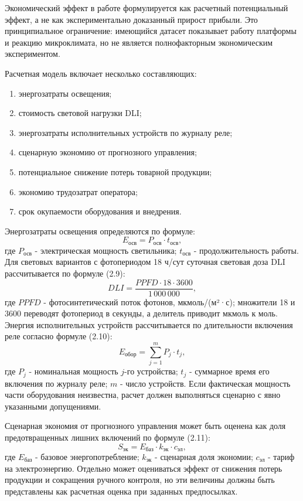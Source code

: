 \documentclass[a4paper,14pt]{extarticle}
\providecommand{\tightlist}{%
  \setlength{\itemsep}{0pt}\setlength{\parskip}{0pt}}
\begin{document}
Экономический эффект в работе формулируется как расчетный потенциальный
эффект, а не как экспериментально доказанный прирост прибыли. Это
принципиальное ограничение: имеющийся датасет показывает работу
платформы и реакцию микроклимата, но не является полнофакторным
экономическим экспериментом.

Расчетная модель включает несколько составляющих:

\begin{enumerate}
\def\labelenumi{\arabic{enumi})}
\tightlist
\item
  энергозатраты освещения;
\item
  стоимость световой нагрузки DLI;
\item
  энергозатраты исполнительных устройств по журналу реле;
\item
  сценарную экономию от прогнозного управления;
\item
  потенциальное снижение потерь товарной продукции;
\item
  экономию трудозатрат оператора;
\item
  срок окупаемости оборудования и внедрения.
\end{enumerate}

Энергозатраты освещения определяются по формуле:
\begin{equation}
E_{\text{осв}} = P_{\text{осв}} \cdot t_{\text{осв}},
\tag{2.8}
\end{equation}
где \(P_{\text{осв}}\) - электрическая мощность светильника;
\(t_{\text{осв}}\) - продолжительность работы. Для световых вариантов с
фотопериодом 18 ч/сут суточная световая доза DLI рассчитывается по
формуле (2.9):
\begin{equation}
DLI = \frac{PPFD \cdot 18 \cdot 3600}{1\,000\,000},
\tag{2.9}
\end{equation}
где \(PPFD\) - фотосинтетический поток фотонов, мкмоль/(м²·с); множители
18 и 3600 переводят фотопериод в секунды, а делитель приводит мкмоль к
моль. Энергия исполнительных устройств рассчитывается по длительности
включения реле согласно формуле (2.10):
\begin{equation}
E_{\text{обор}} = \sum_{j=1}^{m} P_j \cdot t_j,
\tag{2.10}
\end{equation}
где \(P_j\) - номинальная мощность \(j\)-го устройства; \(t_j\) -
суммарное время его включения по журналу реле; \(m\) - число устройств.
Если фактическая мощность части оборудования неизвестна, расчет должен
выполняться сценарно с явно указанными допущениями.

Сценарная экономия от прогнозного управления может быть оценена как доля
предотвращенных лишних включений по формуле (2.11):
\begin{equation}
S_{\text{эк}} = E_{\text{баз}} \cdot k_{\text{эк}} \cdot c_{\text{эл}},
\tag{2.11}
\end{equation}
где \(E_{\text{баз}}\) - базовое энергопотребление; \(k_{\text{эк}}\) -
сценарная доля экономии; \(c_{\text{эл}}\) - тариф на электроэнергию.
Отдельно может оцениваться эффект от снижения потерь продукции и
сокращения ручного контроля, но эти величины должны быть представлены
как расчетная оценка при заданных предпосылках.
\end{document}
